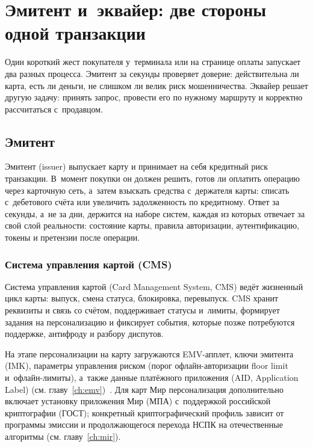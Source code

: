 
\chapter{Эмитент и~эквайер: две стороны одной транзакции}\label{ch:issuer-acquirer}

Один короткий жест покупателя у~терминала или на странице оплаты
запускает два разных процесса. Эмитент за секунды проверяет доверие:
действительна ли карта, есть ли деньги, не слишком ли велик риск
мошенничества. Эквайер решает другую задачу: принять запрос, провести
его по нужному маршруту и корректно рассчитаться с~продавцом.

\section{Эмитент}\label{sec:ia-issuer}

Эмитент (issuer) выпускает карту и принимает на себя кредитный
риск транзакции. В~момент покупки он должен решить, готов ли
оплатить операцию через карточную сеть, а~затем взыскать средства
с~держателя карты: списать с~дебетового счёта или увеличить
задолженность по кредитному. Ответ за секунды, а~не за дни,
держится на наборе систем, каждая из которых отвечает за свой
слой реальности: состояние карты, правила авторизации,
аутентификацию, токены и претензии после операции.

\subsection*{Система управления картой (CMS)}

Система управления картой (Card Management System, CMS) ведёт
жизненный цикл карты: выпуск, смена статуса, блокировка, перевыпуск.
CMS хранит реквизиты и связь со счётом, поддерживает статусы и~лимиты,
формирует задания на персонализацию и фиксирует события, которые
позже потребуются поддержке, антифроду и разбору диспутов.

На этапе персонализации на карту загружаются EMV-апплет, ключи
эмитента (IMK), параметры управления риском (порог офлайн-авторизации
floor limit и~офлайн-лимиты), а~также данные платёжного приложения
(AID, Application Label) (см. главу~\ref{ch:emv})~\cite{emvco-book3,emvco-book4}.
Для карт Мир персонализация дополнительно включает установку
приложения Мир (МПА) с~поддержкой российской криптографии (ГОСТ);
конкретный криптографический профиль зависит от программы эмиссии
и продолжающегося перехода НСПК на отечественные алгоритмы
(см. главу~\ref{ch:mir}).

